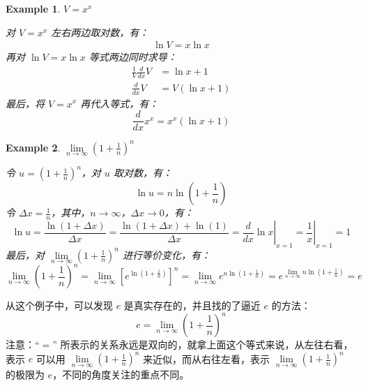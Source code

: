 \documentclass{ctexart}
\numberwithin{equation}{section}
\numberwithin{figure}{section}
\newtheorem{myEx}{Example}[section] %
\begin{document}
\begin{myEx}
    \(V = x^{x}\)

    对 \(V = x^{x}\) 左右两边取对数，有：
    \begin{align*}
        \ln V = x \ln x
    \end{align*}
    再对 \(\ln V = x \ln x\) 等式两边同时求导：
    \begin{align*}
        \frac{1}{V}\frac{d}{dx}V & = \ln x + 1               \\
        \frac{d}{dx}V            & = V\left(\ln x + 1\right)
    \end{align*}
    最后，将 \(V = x^{x}\) 再代入等式，有：
    \begin{equation}
        \frac{d}{dx}x^{x} = x^{x}\left(\ln x + 1\right)
    \end{equation}
\end{myEx}

\begin{myEx}
    \(\lim\limits_{n\to \infty}\left(1 + \frac{1}{n}\right)^{n}\)

    令 \(u = \left(1 + \frac{1}{n}\right)^{n}\)，对 \(u\) 取对数，有：
    \begin{equation*}
        \ln u = n \ln \left(1 + \frac{1}{n}\right)
    \end{equation*}
    令 \(\Delta x = \frac{1}{n}\)，其中，\(n\to \infty\)，\(\Delta x \to 0\)，有：
    \begin{equation*}
        \ln u = \frac{\ln \left(1 + \Delta x\right)}{\Delta x} = \frac{\ln \left(1 + \Delta x\right) + \ln(1)}{\Delta x} = \left.\frac{d}{dx}\ln x\right|_{x = 1} = \left.\frac{1}{x}\right|_{x = 1} = 1
    \end{equation*}
    最后，对 \(\lim\limits_{n\to \infty}\left(1 + \frac{1}{n}\right)^{n}\) 进行等价变化，有：
    \begin{equation}
        \lim\limits_{n\to \infty}\left(1 + \frac{1}{n}\right)^{n} = \lim\limits_{n\to \infty}\left[e^{\ln \left(1 + \frac{1}{n}\right)}\right]^{n} = \lim\limits_{n\to \infty}e^{n\ln \left(1 + \frac{1}{n}\right)} = e^{\lim\limits_{n\to \infty} n\ln \left(1 + \frac{1}{n}\right)} = e
    \end{equation}
\end{myEx}
从这个例子中，可以发现 \(e\) 是真实存在的，并且找的了逼近 \(e\) 的方法：
\begin{equation}
    e = \lim\limits_{n\to \infty}\left(1 + \frac{1}{n}\right)^{n}
\end{equation}
注意：“\(=\)” 所表示的关系永远是双向的，就拿上面这个等式来说，从左往右看，表示 \(e\) 可以用 \(\lim\limits_{n\to \infty}\left(1 + \frac{1}{n}\right)^{n}\) 来近似，而从右往左看，表示 \(\lim\limits_{n\to \infty}\left(1 + \frac{1}{n}\right)^{n}\) 的极限为 \(e\)，不同的角度关注的重点不同。
\end{document}
